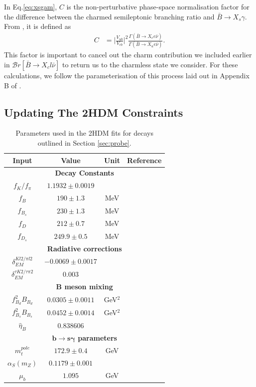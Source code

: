 \documentclass[a4paper,12pt]{article}
\begin{document}
In Eq.\eqref{eq:xsgam}, $C$ is the non-perturbative phase-space normalisation factor for the difference between the charmed semileptonic branching ratio and $\bar{B}\to X_s\gamma$. 
From \cite{bmes}, it is defined as 
\begin{align}
    \label{eq:phasespace}
    C &= \bigg|\frac{V_{ub}}{V_{cb}}\bigg|^2\frac{\Gamma(\bar{B}\to X_ce\bar{\nu})}{\Gamma(\bar{B}\to X_ue\bar{\nu})}.
\end{align}
This factor is important to cancel out the charm contribution we included earlier in $\mathcal{B}r[\bar{B}\to X_cl\bar{\nu}]$ to return us to the charmless state we consider.
For these calculations, we follow the parameterisation of this process laid out in Appendix B of \cite{desc}.

\subsection{Updating The 2HDM Constraints}
\label{subsec:fit}
\begin{table}
    \centering
    \begin{tabular}{c|ccc}
        \hline\hline
        Input & Value & Unit & Reference \\
        \hline\hline
        \multicolumn{4}{c}{\bfseries Decay Constants} \\
        \hline\hline
        $f_K/f_\pi$ & $1.1932\pm0.0019$ & & \cite{pdg}\\
        $f_B$ & $190\pm1.3$ & MeV & \cite{flag} \\
        $f_{B_s}$ & $230\pm1.3$ & MeV & \cite{flag} \\
        $f_D$ & $212\pm0.7$ & MeV & \cite{flag} \\
        $f_{D_s}$ & $249.9\pm0.5$ & MeV & \cite{flag} \\
        \hline\hline
        \multicolumn{4}{c}{\bfseries Radiative corrections} \\
        \hline\hline
        $\delta^{Kl2/\pi l2}_{EM}$ & $-0.0069\pm0.0017$ & & \cite{pdg} \\
        $\delta^{\tau K2/\tau\pi 2}_{EM}$ & $0.003$ & & \cite{desc} \\
        \hline\hline
        \multicolumn{4}{c}{\bfseries B meson mixing} \\
        \hline\hline
        $f^2_{B_d}B_{B_d}$ & $0.0305\pm0.0011$ & GeV$^2$ & \cite{bmix} \\
        $f^2_{B_s}B_{B_s}$ & $0.0452\pm0.0014$ & GeV$^2$ & \cite{bmix} \\
        $\hat{\eta}_B$ & $0.838606$ & & \cite{alex} \\
        \hline\hline
        \multicolumn{4}{c}{\bfseries $\mathbf{b\to s\gamma}$ parameters} \\
        \hline\hline
        $m_t^{pole}$ & $172.9\pm0.4$ & GeV & \cite{pdg} \\
        $\alpha_S(m_Z)$ & $0.1179\pm0.001$ & & \cite{pdg} \\
        $\mu_b$ & $1.095$ & GeV & \\
        \hline\hline
    \end{tabular}
    \caption{\label{tab:params} Parameters used in the 2HDM fits for decays outlined in Section \ref{sec:probe}.}
\end{table}
\end{document}
